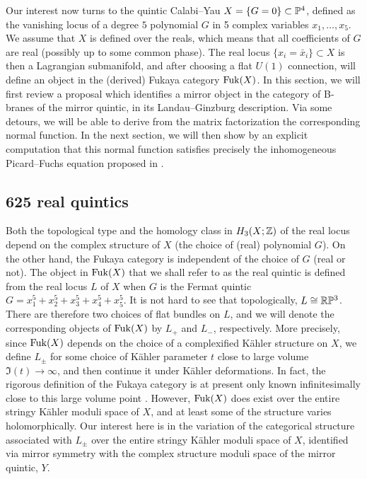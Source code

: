 Our interest now turns to the quintic Calabi--Yau $X=\{G=0\}\subset{\mathbb P}^4$,
defined as the vanishing locus of a degree $5$ polynomial $G$ in 5
complex variables $x_1,\ldots,x_5$. We assume that $X$ is defined over
the reals, which means that all coefficients of $G$ are real (possibly up 
to some common phase). The real locus $\{x_i=\bar x_i\}\subset X$
is then a Lagrangian submanifold, and after choosing a flat $U(1)$ connection, 
will define an object in the (derived) Fukaya category ${\rm Fuk}(X)$. 
In this section, we will first review a proposal which identifies a mirror 
object in the category of B-branes of the mirror quintic, in its 
Landau--Ginzburg description. Via some detours, we will be able to derive 
from the matrix factorization the corresponding normal function. In the next 
section, we will then show by an explicit computation that this normal 
function satisfies precisely the inhomogeneous Picard--Fuchs equation proposed 
in \cite{open}.


\subsection{625 real quintics}

Both the topological type and the homology class in $H_3(X;{\mathbb Z})$ of the real 
locus depend on the complex structure of $X$ (the choice of (real) polynomial 
$G$). On the other hand, the Fukaya category is independent of the choice
of $G$ (real or not). The object in ${\rm Fuk}(X)$ that we shall refer to 
as the real quintic is defined from the real locus $L$ of $X$ when $G$ is
the Fermat quintic $G=x_1^5+x_2^5+x_3^5+x_4^5+x_5^5$. It is not
hard to see that topologically, $L\cong {\mathbb R}{\mathbb P}^3$. There
are therefore two choices of flat bundles on $L$, and we will denote
the corresponding objects of ${\rm Fuk}(X)$ by $L_+$ and $L_-$, respectively.
More precisely, since ${\rm Fuk}(X)$ depends on the choice of a complexified
K\"ahler structure on $X$, we define $L_\pm$ for some choice of K\"ahler
parameter $t$ close to large volume $\Im(t)\to\infty$, and then continue
it under K\"ahler deformations. In fact, the rigorous definition of the Fukaya 
category is at present only known infinitesimally close to this large 
volume point \cite{fooo}. However, ${\rm Fuk}(X)$ 
does exist over the entire stringy K\"ahler moduli space of $X$, and
at least some of the structure varies holomorphically. Our interest here 
is in the variation of the categorical structure associated with $L_\pm$ 
over the entire stringy K\"ahler moduli space of $X$, identified via
mirror symmetry with the complex structure moduli space of the mirror
quintic, $Y$.

